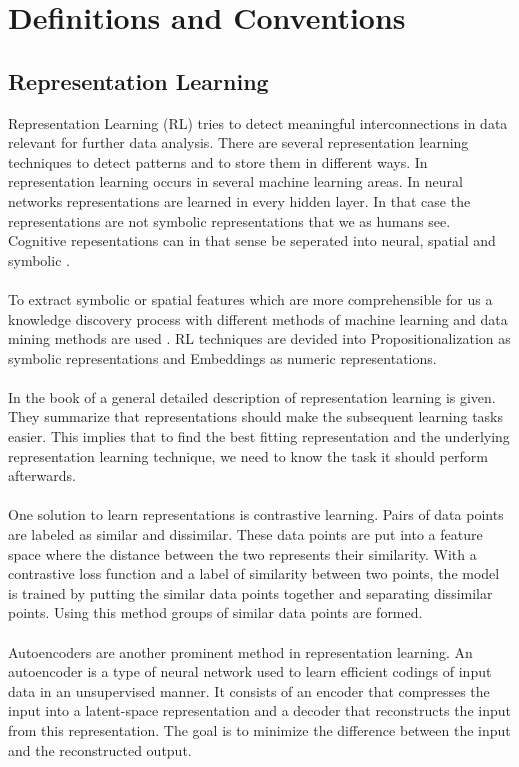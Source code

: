 \section{Definitions and Conventions}\label{theory}
\subsection{Representation Learning}
Representation Learning (RL) tries to detect meaningful interconnections in data relevant for further data analysis. There are several representation learning techniques to detect patterns and to store them in different ways. In  representation learning occurs in several machine learning areas. In neural networks representations are learned in every hidden layer. In that case the representations are not symbolic representations that we as humans see. Cognitive repesentations can in that sense be seperated into neural, spatial and symbolic \cite{gardenfors_conceptual_2000}.\\\\
To extract symbolic or spatial features which are more comprehensible for us a knowledge discovery process with different methods of machine learning and data mining methods are used \cite[p. 4]{lavrac_representation_2021}. RL techniques are devided into Propositionalization as symbolic representations and Embeddings as numeric representations.\\\\
In the book of  a general detailed description of representation learning is given. They summarize that representations should make the subsequent learning tasks easier. This implies that to find the best fitting representation and the underlying representation learning technique, we need to know the task it should perform afterwards.\\\\
One solution to learn representations is contrastive learning. Pairs of data points are labeled as similar and dissimilar. These data points are put into a feature space where the distance between the two represents their similarity. With a contrastive loss function and a label of similarity between two points, the model is trained by putting the similar data points together and separating dissimilar points. Using this method groups of similar data points are formed. \\\\
Autoencoders are another prominent method in representation learning. An autoencoder is a type of neural network used to learn efficient codings of input data in an unsupervised manner. It consists of an encoder that compresses the input into a latent-space representation and a decoder that reconstructs the input from this representation. The goal is to minimize the difference between the input and the reconstructed output.\\\\
